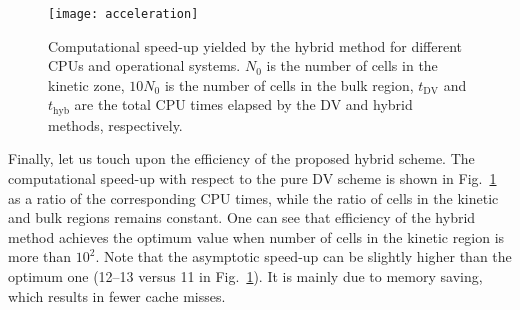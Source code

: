 \documentclass{elsarticle} %
\newcommand{\DV}{\mathrm{DV}\!}
\begin{document}
\begin{comment}%

\begin{figure}
    \centering
    \texttt{[image: \_pois\_hybr\_kn01\_cropped]}
    \caption{
        The normalized longitudinal velocity in the linear force-driven Poiseuille flow between parallel plates for $k=0.1$.
        The position of the coupling interface are shown by the vertical dashed lines.
    }\label{fig:poiseuille}
\end{figure}

In addition, the linear Poiseuille-flow problem is solved numerically.
The hybrid solution is compared with the DV and LB ones in Fig.~\ref{fig:poiseuille},
where the D2Q9-regularized LB model is employed~\cite{Latt2006, Mont2015}.
The hybrid solution based on the D2Q9-regularized model is very close to the DV results,
while the D2Q9-regularized model is failed to capture the Knudsen-layer part of the solution.
It is clearly seen from Fig.~\ref{fig:poiseuille} that the application of the regularized LB models in the hybrid scheme
can positively affect the solution accuracy in comparison to the conventional LB models.

\end{comment}

\begin{figure}
    \centering
    \texttt{[image: acceleration]}
    \caption{
        Computational speed-up yielded by the hybrid method for different CPUs and operational systems.
        $N_0$ is the number of cells in the kinetic zone, $10N_0$ is the number of cells in the bulk region,
        $t_\DV$ and $t_\mathrm{hyb}$ are the total CPU times elapsed by the DV and hybrid methods, respectively.
    }\label{fig:speed-up}
\end{figure}

Finally, let us touch upon the efficiency of the proposed hybrid scheme.
The computational speed-up with respect to the pure DV scheme is shown in Fig.~\ref{fig:speed-up} as a ratio of the corresponding CPU times,
while the ratio of cells in the kinetic and bulk regions remains constant.
One can see that efficiency of the hybrid method achieves the optimum value when number of cells in the kinetic region is more than $10^2$.
Note that the asymptotic speed-up can be slightly higher than the optimum one (12--13 versus 11 in Fig.~\ref{fig:speed-up}).
It is mainly due to memory saving, which results in fewer cache misses.
\end{document}
